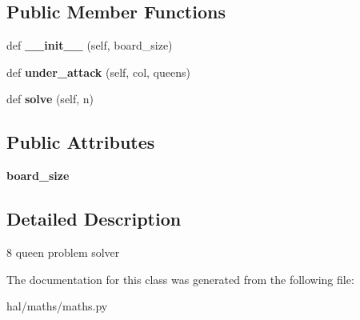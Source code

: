 \subsection*{Public Member Functions}
\begin{DoxyCompactItemize}
\item 
def {\bfseries \+\_\+\+\_\+init\+\_\+\+\_\+} (self, board\+\_\+size)\hypertarget{classhal_1_1maths_1_1maths_1_1_eight_queen_a71642e4346629fda32e51c647c28fa3f}{}\label{classhal_1_1maths_1_1maths_1_1_eight_queen_a71642e4346629fda32e51c647c28fa3f}

\item 
def {\bfseries under\+\_\+attack} (self, col, queens)\hypertarget{classhal_1_1maths_1_1maths_1_1_eight_queen_a8e7e221caa5ac408c49d69116076595e}{}\label{classhal_1_1maths_1_1maths_1_1_eight_queen_a8e7e221caa5ac408c49d69116076595e}

\item 
def {\bfseries solve} (self, n)\hypertarget{classhal_1_1maths_1_1maths_1_1_eight_queen_a8147e8ea2dabfa44b3c8d13e04d7b529}{}\label{classhal_1_1maths_1_1maths_1_1_eight_queen_a8147e8ea2dabfa44b3c8d13e04d7b529}

\end{DoxyCompactItemize}
\subsection*{Public Attributes}
\begin{DoxyCompactItemize}
\item 
{\bfseries board\+\_\+size}\hypertarget{classhal_1_1maths_1_1maths_1_1_eight_queen_a8d242fe77a100b25c6ab6e861069623b}{}\label{classhal_1_1maths_1_1maths_1_1_eight_queen_a8d242fe77a100b25c6ab6e861069623b}

\end{DoxyCompactItemize}


\subsection{Detailed Description}
\begin{DoxyVerb}8 queen problem solver \end{DoxyVerb}
 

The documentation for this class was generated from the following file\+:\begin{DoxyCompactItemize}
\item 
hal/maths/maths.\+py\end{DoxyCompactItemize}
